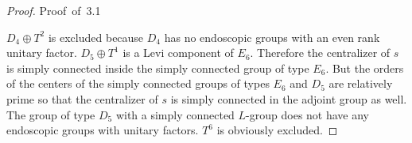 \documentclass{memo-l}
\theoremstyle{definition}
\theoremstyle{remark}
\numberwithin{section}{chapter}
\numberwithin{equation}{chapter}
\begin{document}
\begin{proof} {Proof\ of\ 3.1}

   $D_{4}\oplus T^{2}$ is excluded because $D_{4}$ has no endoscopic groups with
an even rank unitary factor.  $D_{5}\oplus T^{1}$ is a Levi component of
$E_{6}$.  Therefore the centralizer of $s$ is simply connected inside the
simply connected group of type $E_{6}$.  But the orders of the centers of
the simply connected groups of types $E_{6}$ and $D_{5}$ are relatively
prime so that the centralizer of $s$ is simply connected in the adjoint
group as well.  The group of type $D_{5}$ with a simply connected $L$-group
does not have any endoscopic groups with unitary factors.  $T^{6}$ is
obviously excluded.


\end{proof}
\end{document}
